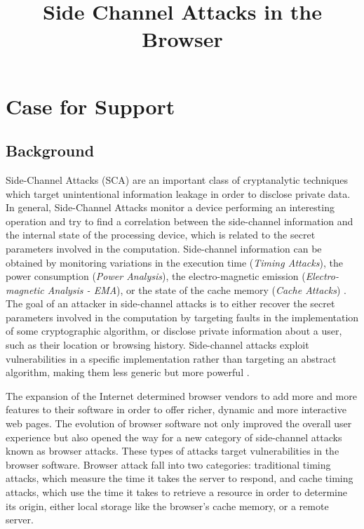 \documentclass[a4paper,11pt]{article}
\title{Side Channel Attacks in the Browser}
\date{}
\begin{document}
\maketitle

\section*{Case for Support}


\subsection*{Background}
Side-Channel Attacks (SCA) are an important class of cryptanalytic techniques which target unintentional information leakage in order to disclose private data. In general, Side-Channel Attacks monitor a device performing an interesting operation and try to find a correlation between the side-channel information and the internal state of the processing device, which is related to the secret parameters involved in the computation. Side-channel information can be obtained by monitoring variations in the execution time (\textit{Timing Attacks}), the power consumption (\textit{Power Analysis}), the electro-magnetic emission (\textit{Electro-magnetic Analysis - EMA}), or the state of the cache memory (\textit{Cache Attacks}) \cite{standaert2010introduction}. The goal of an attacker in side-channel attacks is to either recover the secret parameters involved in the computation by targeting faults in the implementation of some cryptographic algorithm, or disclose private information about a user, such as their location or browsing history. Side-channel attacks exploit vulnerabilities in a specific implementation rather than targeting an abstract algorithm, making them less generic but more powerful \cite{standaert2010introduction}.

The expansion of the Internet determined browser vendors to add more and more features to their software in order to offer richer, dynamic and more interactive web pages. The evolution of browser software not only improved the overall user experience but also opened the way for a new category of side-channel attacks known as browser attacks. These types of attacks target vulnerabilities in the browser software. Browser attack fall into two categories: traditional timing attacks, which measure the time it takes the server to respond, and cache timing attacks, which use the time it takes to retrieve a resource in order to determine its origin, either local storage like the browser's cache memory, or a remote server.
\end{document}
